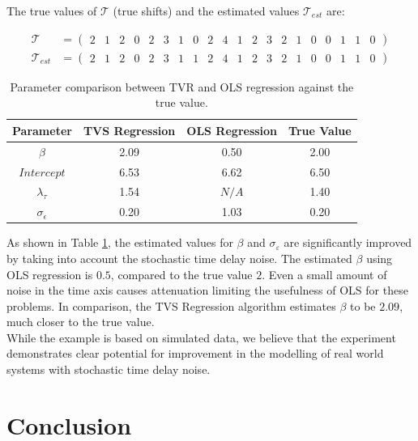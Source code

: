 \documentclass[11pt]{amsart}
\theoremstyle{definition}
\begin{document}
The true values of $\mathcal{T}$ (true shifts) and the estimated values $\mathcal{T}_{est}$ are:

\begin{align*}
\mathcal{T} &= 
\left(
\begin{array}{cccccccccccccccccccc}
2 & 1 & 2 & 0 & 2 & 3 & 1 & 0 & 2 & 4 & 1 & 2 & 3 & 2 & 1 & 0  & 0 & 1 & 1 & 0 
\end{array}  
\right) \\
\mathcal{T}_{est} &= 
\left(
\begin{array}{cccccccccccccccccccc}   
2 & 1 & 2 & 0 & 2 & 3 & 1 & 1 & 2 & 4 & 1 & 2 & 3 & 2 & 1 & 0  & 0 & 1 & 1 & 0 
\end{array}  
\right)
\end{align*}


\begin{center}
\begin{table}
\begin{tabular}{|c|c|c|c|}
\hline
Parameter & TVS Regression & OLS Regression & True Value \\
\hline
$\beta$ & 2.09 & 0.50 & 2.00  \\
\hline
$Intercept$ & 6.53 & 6.62 & 6.50 \\
\hline
$\lambda_{\tau}$ & 1.54 & $N/A$ & 1.40 \\
\hline
$\sigma_{\epsilon}$ & 0.20 & 1.03 & 0.20 \\
\hline
\end{tabular}
\caption{ Parameter comparison between TVR and OLS regression against the true value.} 
\label{results_table}
\end{table}
\end{center}

As shown in Table \ref{results_table}, the estimated values for $\beta$ and $\sigma_{\varepsilon}$ are significantly improved by taking into account the stochastic time delay noise. The estimated $\beta$ using OLS regression is $0.5$, compared to the true value $2$. Even a small amount of noise in the time axis causes attenuation limiting the usefulness of OLS for these problems. In comparison, the TVS Regression algorithm estimates $\beta$ to be $2.09$, much closer to the true value.\\

While the example is based on simulated data, we believe that the experiment demonstrates clear potential for improvement in the modelling of real world systems with stochastic time delay noise.


\section{Conclusion}
\end{document}
